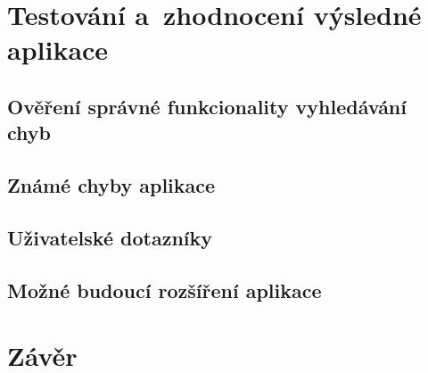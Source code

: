\chapter{Testování a~zhodnocení výsledné aplikace}

\dummyShortText[10]


\section{Ověření správné funkcionality vyhledávání chyb}


\section{Známé chyby aplikace}


\section{Uživatelské dotazníky}


\section{Možné budoucí rozšíření aplikace}





\chapter{Závěr}

\dummyShortText[8]

\dummyText[2]





%
